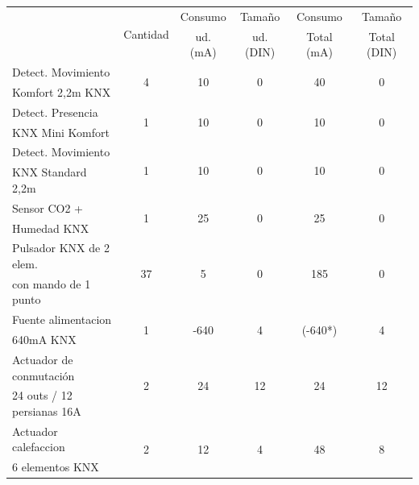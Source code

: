 \begin{flushleft}
\begin{table}[H]
\begin{tabular}{|p{4cm}|c|c|c|c|c|}
\hline 
\rule[0mm]{0mm}{5mm}
\multirow{2}{*}{Descripción}  &  \multirow{2}{*}{Cantidad} & Consumo & Tamaño & Consumo & Tamaño\\
&  &  ud. (mA) &  ud. (DIN) &  Total  (mA) & Total (DIN)\\
\hline
\hline
\rule[0mm]{0mm}{4mm}
Detect. Movimiento &  \multirow{2}{*}{4} &  \multirow{2}{*}{10} &  \multirow{2}{*}{0} &  \multirow{2}{*}{40} &  \multirow{2}{*}{0}\\
Komfort 2,2m KNX& & & & &\\
\hline
\rule[0mm]{0mm}{4mm}
Detect. Presencia  & \multirow{2}{*}{1} & \multirow{2}{*}{10} & \multirow{2}{*}{0} & \multirow{2}{*}{10} & \multirow{2}{*}{0}\\
 KNX Mini Komfort & & & & &\\
\hline
\rule[0mm]{0mm}{4mm}
Detect. Movimiento &  \multirow{2}{*}{1} &  \multirow{2}{*}{10} &  \multirow{2}{*}{0} &  \multirow{2}{*}{10} &  \multirow{2}{*}{0}\\
 KNX Standard 2,2m & & & & &\\
\hline
\rule[0mm]{0mm}{4mm}
\rule[0mm]{0mm}{4mm}
Sensor CO2 +  & \multirow{2}{*}{1} & \multirow{2}{*}{25} & \multirow{2}{*}{0} & \multirow{2}{*}{25} & \multirow{2}{*}{0}\\
Humedad KNX & & & & &\\
\hline
\rule[0mm]{0mm}{4mm}
Pulsador KNX de 2 elem. &  \multirow{2}{*}{37} &  \multirow{2}{*}{5} &  \multirow{2}{*}{0} &  \multirow{2}{*}{185} &  \multirow{2}{*}{0}\\
con mando de 1 punto  & & & & &\\
\hline
\rule[0mm]{0mm}{4mm}
Fuente alimentacion & \multirow{2}{*}{1} & \multirow{2}{*}{-640} & \multirow{2}{*}{4} &  \multirow{2}{*}{(-640*)} & \multirow{2}{*}{4}\\
 640mA KNX  & & & & &\\
\hline
\rule[0mm]{0mm}{4mm}
Actuador de conmutación   &  \multirow{2}{*}{2} &  \multirow{2}{*}{24} &  \multirow{2}{*}{12} &  \multirow{2}{*}{24} &  \multirow{2}{*}{12}\\
24 outs / 12 persianas 16A  & & & & &\\
\hline
\rule[0mm]{0mm}{4mm}
Actuador calefaccion & \multirow{2}{*}{2} & \multirow{2}{*}{12} & \multirow{2}{*}{4} & \multirow{2}{*}{48} & \multirow{2}{*}{8}\\
6 elementos KNX & & & & &\\

\end{tabular}
\end{table}
\end{flushleft}
